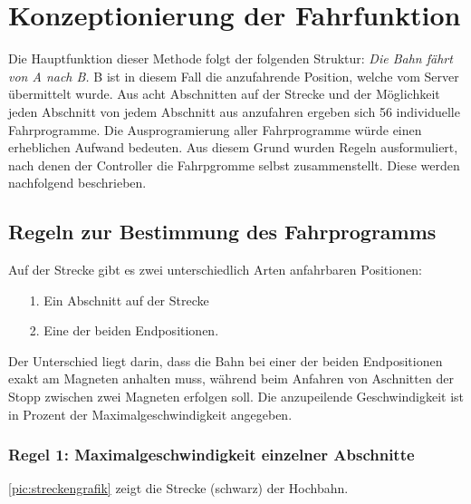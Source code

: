 \section{Konzeptionierung der Fahrfunktion}
\label{sec:konFahr}
Die Hauptfunktion dieser Methode folgt der folgenden Struktur: \textit{Die Bahn fährt von A nach B.} B ist in diesem Fall die anzufahrende Position, welche vom Server übermittelt wurde. Aus acht Abschnitten auf der Strecke und der Möglichkeit jeden Abschnitt von jedem Abschnitt aus anzufahren ergeben sich 56 individuelle Fahrprogramme. Die Ausprogramierung aller Fahrprogramme würde einen erheblichen Aufwand bedeuten. Aus diesem Grund wurden Regeln ausformuliert, nach denen der Controller die Fahrpgromme selbst zusammenstellt. Diese werden nachfolgend beschrieben. 

\subsection{Regeln zur Bestimmung des Fahrprogramms}
Auf der Strecke gibt es zwei unterschiedlich Arten anfahrbaren Positionen:
\begin{center}
	\begin{itemize}
		\item [1.] Ein Abschnitt auf der Strecke
		\item [2.] Eine der beiden Endpositionen.
	\end{itemize}
\end{center}
Der Unterschied liegt darin, dass die Bahn bei einer der beiden Endpositionen exakt am Magneten anhalten muss, während beim Anfahren von Aschnitten der Stopp zwischen zwei Magneten erfolgen soll. Die anzupeilende Geschwindigkeit ist in Prozent der Maximalgeschwindigkeit angegeben.
\newpage 
\subsubsection{Regel 1: Maximalgeschwindigkeit einzelner Abschnitte}
\autoref{pic:streckengrafik} zeigt die Strecke (schwarz) der Hochbahn.

